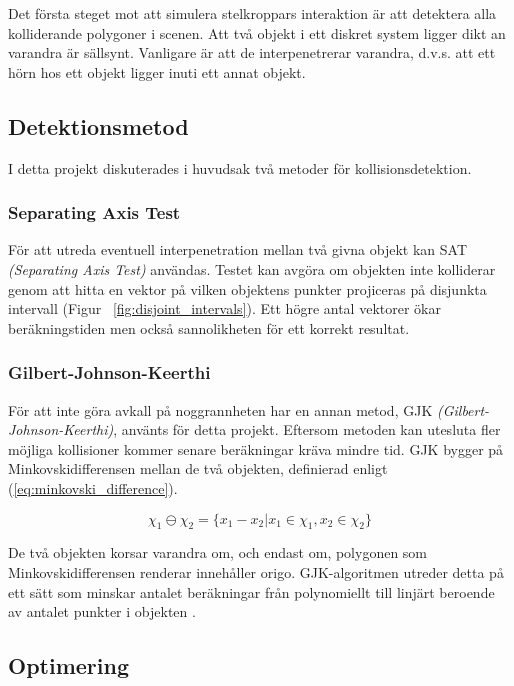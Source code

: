 \documentclass[a4paper,12pt,twocolumn,swedish]{article}
\begin{document}
Det första steget mot att simulera stelkroppars interaktion är att detektera alla kolliderande polygoner i scenen. Att två objekt i ett diskret system ligger dikt an varandra är sällsynt. Vanligare är att de interpenetrerar varandra, d.v.s. att ett hörn hos ett objekt ligger inuti ett annat objekt.

\subsection{Detektionsmetod}

I detta projekt diskuterades i huvudsak två metoder för kollisionsdetektion.

\subsubsection{Separating Axis Test}
För att utreda eventuell interpenetration mellan två givna objekt kan SAT \cite[s.~29]{vella08} \emph{(Separating Axis Test)} användas. Testet kan avgöra om objekten inte kolliderar genom att hitta en vektor på vilken objektens punkter projiceras på disjunkta intervall (Figur ~\ref{fig:disjoint_intervals}). Ett högre antal vektorer ökar beräkningstiden men också sannolikheten för ett korrekt resultat.

\subsubsection{Gilbert-Johnson-Keerthi}
För att inte göra avkall på noggrannheten har en annan metod, GJK \cite[s.~30]{vella08} \emph{(Gilbert-Johnson-Keerthi)}, använts för detta projekt. Eftersom metoden kan utesluta fler möjliga kollisioner kommer senare beräkningar kräva mindre tid. GJK bygger på Minkovskidifferensen mellan de två objekten, definierad enligt (\ref{eq:minkovski_difference}).

\begin{equation}\label{eq:minkovski_difference}
\chi_1 \ominus \chi_2 = \{x_1 - x_2|x_1 \in \chi_1, x_2 \in \chi_2\}
\end{equation}

De två objekten korsar varandra om, och endast om, polygonen som Minkovskidifferensen renderar innehåller origo. GJK-algoritmen utreder detta på ett sätt som minskar antalet beräkningar från polynomiellt till linjärt beroende av antalet punkter i objekten \cite{bergen99}.

\subsection{Optimering}
\end{document}
